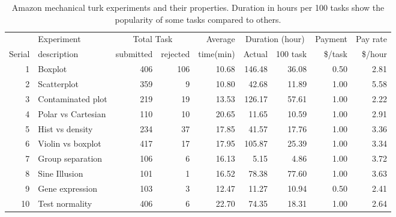 \documentclass[11pt]{article}
\begin{document}
\begin{table}[hbtp]
\caption{Amazon mechanical turk experiments and their properties. Duration in hours per 100 tasks show the popularity of some tasks compared to others.}
\centering
\begin{tabular}{rlrrrrrrr}
  \hline
& Experiment& \multicolumn{2}{c}{ Total Task}& Average & \multicolumn{2}{c}{Duration (hour)} & Payment & Pay rate\\
\cline{3-4} \cline{6-7}
Serial & description & submitted & rejected & time(min) & Actual & 100 task& \$/task & \$/hour\\ 
  \hline
1 & Boxplot & 406 & 106 & 10.68 & 146.48 & 36.08 & 0.50 & 2.81 \\ 
  2 & Scatterplot & 359 &   9 & 10.80 & 42.68 & 11.89 & 1.00 & 5.58 \\ 
  3 & Contaminated plot & 219 &  19 & 13.53 & 126.17 & 57.61 & 1.00 & 2.22 \\ 
  4 & Polar vs Cartesian & 110 &  10 & 20.65 & 11.65 & 10.59 & 1.00 & 2.91 \\ 
  5 & Hist vs density & 234 &  37 & 17.85 & 41.57 & 17.76 & 1.00 & 3.36 \\ 
  6 & Violin vs boxplot & 417 &  17 & 17.95 & 105.87 & 25.39 & 1.00 & 3.34 \\ 
  7 & Group separation & 106 &   6 & 16.13 & 5.15 & 4.86 & 1.00 & 3.72 \\ 
  8 & Sine Illusion & 101 &   1 & 16.52 & 78.38 & 77.60 & 1.00 & 3.63 \\ 
  9 & Gene expression & 103 &   3 & 12.47 & 11.27 & 10.94 & 0.50 & 2.41 \\ 
  10 & Test normality & 406 &   6 & 22.70 & 74.35 & 18.31 & 1.00 & 2.64 \\ 
   \hline
\end{tabular}
\label{tbl:mturk}
\end{table}
\end{document}

